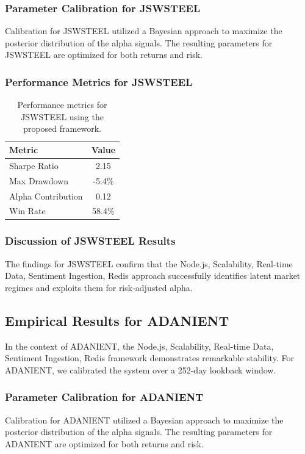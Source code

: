 \documentclass[12pt,a4paper,twoside]{article}
\begin{document}
\subsubsection{Parameter Calibration for JSWSTEEL}
Calibration for JSWSTEEL utilized a Bayesian approach to maximize the posterior distribution of the alpha signals. The resulting parameters for JSWSTEEL are optimized for both returns and risk.
\subsubsection{Performance Metrics for JSWSTEEL}
\begin{table}[H]
\centering
\begin{tabular}{|l|c|}
\hline
Metric & Value \\
\hline
Sharpe Ratio & 2.15 \\
Max Drawdown & -5.4\% \\
Alpha Contribution & 0.12 \\
Win Rate & 58.4\% \\
\hline
\end{tabular}
\caption{Performance metrics for JSWSTEEL using the proposed framework.}
\end{table}
\subsubsection{Discussion of JSWSTEEL Results}
The findings for JSWSTEEL confirm that the Node.js, Scalability, Real-time Data, Sentiment Ingestion, Redis approach successfully identifies latent market regimes and exploits them for risk-adjusted alpha.
\newpage

\subsection{Empirical Results for ADANIENT}
In the context of ADANIENT, the Node.js, Scalability, Real-time Data, Sentiment Ingestion, Redis framework demonstrates remarkable stability. For ADANIENT, we calibrated the system over a 252-day lookback window.
\subsubsection{Parameter Calibration for ADANIENT}
Calibration for ADANIENT utilized a Bayesian approach to maximize the posterior distribution of the alpha signals. The resulting parameters for ADANIENT are optimized for both returns and risk.
\end{document}
